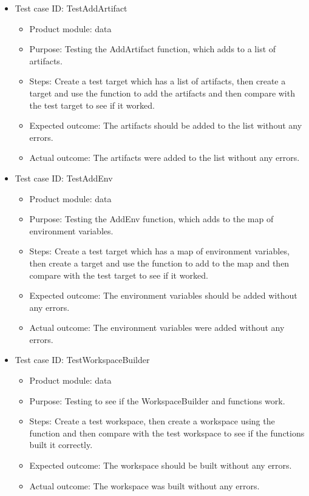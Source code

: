 \documentclass[11pt]{article}
\begin{document}
\begin{itemize}
    \item Test case ID: TestAddArtifact
    \begin{itemize}
        \item Product module: data
        \item Purpose: Testing the AddArtifact function, which adds to a list of artifacts.
        \item Steps: Create a test target which has a list of artifacts, then create a target and use the function to add the artifacts and then compare with the test target to see if it worked.
        \item Expected outcome: The artifacts should be added to the list without any errors.
        \item Actual outcome: The artifacts were added to the list without any errors.
    \end{itemize}
\end{itemize}

\begin{itemize}
    \item Test case ID: TestAddEnv
    \begin{itemize}
        \item Product module: data
        \item Purpose: Testing the AddEnv function, which adds to the map of environment variables.
        \item Steps: Create a test target which has a map of environment variables, then create a target and use the function to add to the map and then compare with the test target to see if it worked.
        \item Expected outcome: The environment variables should be added without any errors.
        \item Actual outcome: The environment variables were added without any errors.
    \end{itemize}
\end{itemize}

\begin{itemize}
    \item Test case ID: TestWorkspaceBuilder
    \begin{itemize}
        \item Product module: data
        \item Purpose: Testing to see if the WorkspaceBuilder and functions work.
        \item Steps: Create a test workspace, then create a workspace using the function and then compare with the test workspace to see if the functions built it correctly.
        \item Expected outcome: The workspace should be built without any errors.
        \item Actual outcome: The workspace was built without any errors.
    \end{itemize}
\end{itemize}
\end{document}
